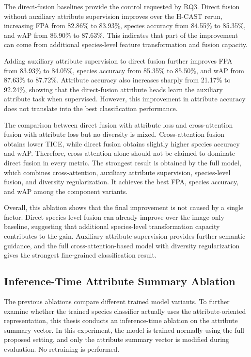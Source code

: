 The direct-fusion baselines provide the control requested by RQ3. Direct fusion without auxiliary attribute supervision improves over the H-CAST rerun, increasing FPA from 82.86\% to 83.93\%, species accuracy from 84.55\% to 85.35\%, and wAP from 86.90\% to 87.63\%. This indicates that part of the improvement can come from additional species-level feature transformation and fusion capacity.

Adding auxiliary attribute supervision to direct fusion further improves FPA from 83.93\% to 84.05\%, species accuracy from 85.35\% to 85.50\%, and wAP from 87.63\% to 87.72\%. Attribute accuracy also increases sharply from 21.17\% to 92.24\%, showing that the direct-fusion attribute heads learn the auxiliary attribute task when supervised. However, this improvement in attribute accuracy does not translate into the best classification performance.

The comparison between direct fusion with attribute loss and cross-attention fusion with attribute loss but no diversity is mixed. Cross-attention fusion obtains lower TICE, while direct fusion obtains slightly higher species accuracy and wAP. Therefore, cross-attention alone should not be claimed to dominate direct fusion in every metric. The strongest result is obtained by the full model, which combines cross-attention, auxiliary attribute supervision, species-level fusion, and diversity regularization. It achieves the best FPA, species accuracy, and wAP among the component variants.

Overall, this ablation shows that the final improvement is not caused by a single factor. Direct species-level fusion can already improve over the image-only baseline, suggesting that additional species-level transformation capacity contributes to the gain. Auxiliary attribute supervision provides further semantic guidance, and the full cross-attention-based model with diversity regularization gives the strongest fine-grained classification result.





\subsection{Inference-Time Attribute Summary Ablation}

The previous ablations compare different trained model variants. To further examine whether the trained species classifier actually uses the attribute-oriented representation, this thesis conducts an inference-time ablation on the attribute summary vector. In this experiment, the model is trained normally using the full proposed setting, and only the attribute summary vector is modified during evaluation. No retraining is performed.

